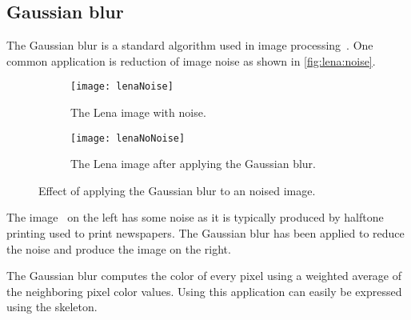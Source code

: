 \subsection{Gaussian blur}
\label{sec:gauss}
The Gaussian blur is a standard algorithm used in image processing~\cite{Umbaugh1997}.
One common application is reduction of image noise as shown in \autoref{fig:lena:noise}.
%
\begin{figure}[tb]
  \centering
  \begin{subfigure}[t]{.45\textwidth}
    \texttt{[image: lenaNoise]}
    \caption{The Lena image with noise.}
    \label{fig:lena:noise:yes}
  \end{subfigure}
  \hfill
  \begin{subfigure}[t]{.45\textwidth}
    \texttt{[image: lenaNoNoise]}
    \caption{The Lena image after applying the Gaussian blur.}
    \label{fig:lena:noise:no}
  \end{subfigure}
  \caption{Effect of applying the Gaussian blur to an noised image.}
  \label{fig:lena:noise}
\end{figure}
%
The image~\cite{} on the left has some noise as it is typically produced by halftone printing used to print newspapers.
The Gaussian blur has been applied to reduce the noise and produce the image on the right.

The Gaussian blur computes the color of every pixel using a weighted average of the neighboring pixel color values.
Using \SkelCL this application can easily be expressed using the \stencil skeleton.


